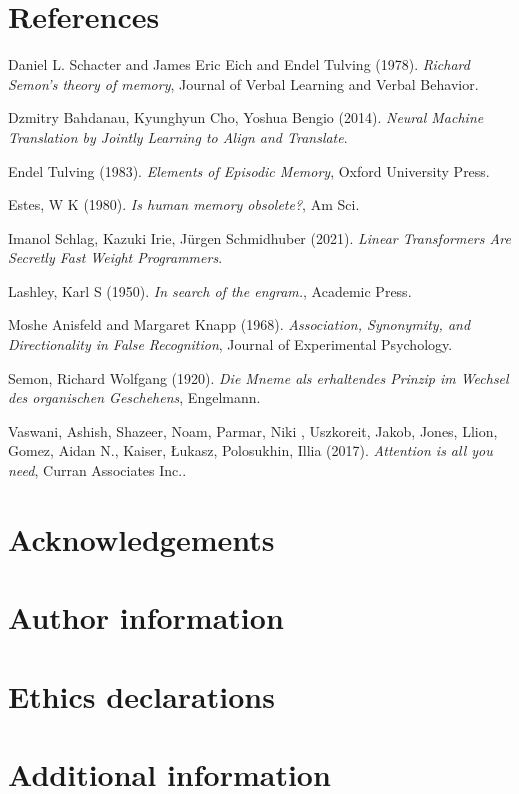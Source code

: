 \documentclass[11pt]{article}
\begin{document}
\section*{References}
\label{sec:orgf05cc35}

\noindent
Daniel L. Schacter and James Eric Eich and Endel Tulving (1978). \emph{Richard Semon's theory of memory}, Journal of Verbal Learning and Verbal Behavior.

\noindent
Dzmitry Bahdanau, Kyunghyun Cho, Yoshua Bengio (2014). \emph{Neural Machine Translation by Jointly Learning to Align and Translate}.

\noindent
Endel Tulving (1983). \emph{Elements of Episodic Memory}, Oxford University Press.

\noindent
Estes, W K (1980). \emph{Is human memory obsolete?}, Am Sci.

\noindent
Imanol Schlag, Kazuki Irie, Jürgen Schmidhuber (2021). \emph{Linear Transformers Are Secretly Fast Weight Programmers}.

\noindent
Lashley, Karl S (1950). \emph{In search of the engram.}, Academic Press.

\noindent
Moshe Anisfeld and Margaret Knapp (1968). \emph{Association, Synonymity, and Directionality in False Recognition}, Journal of Experimental Psychology.

\noindent
Semon, Richard Wolfgang (1920). \emph{Die Mneme als erhaltendes Prinzip im Wechsel des organischen Geschehens}, Engelmann.

\noindent
Vaswani, Ashish, Shazeer, Noam, Parmar, Niki , Uszkoreit, Jakob, Jones, Llion, Gomez, Aidan N., Kaiser, Łukasz, Polosukhin, Illia (2017). \emph{Attention is all you need}, Curran Associates Inc..

\section*{Acknowledgements}
\label{sec:org247a649}
\section*{Author information}
\label{sec:orgee940d7}
\section*{Ethics declarations}
\label{sec:org0a000ee}
\section*{Additional information}
\label{sec:org9a3dcb9}
\end{document}
